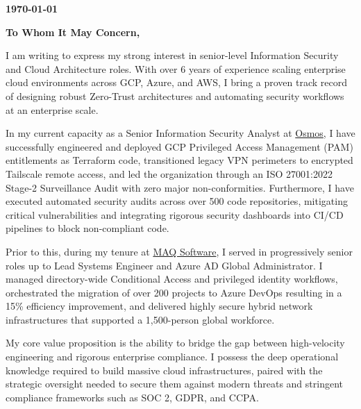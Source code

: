\documentclass[11pt, letterpaper]{article}
\begin{document}
\hfill
\begin{minipage}[t][\textheight]{5.2in}
    \vspace{0.8in}
    \color{maintext}
    
    \textbf{\today}
    
    \vspace{0.4in}
    
    {\Large \textbf{\textcolor{accentcolor}{To Whom It May Concern,}}}
    
    \vspace{0.2in}
    
    I am writing to express my strong interest in senior-level Information Security and Cloud Architecture roles. With over 6 years of experience scaling enterprise cloud environments across GCP, Azure, and AWS, I bring a proven track record of designing robust Zero-Trust architectures and automating security workflows at an enterprise scale.
    
    In my current capacity as a Senior Information Security Analyst at \href{https://osmos.ai}{\textcolor{accentcolor}{Osmos}}, I have successfully engineered and deployed GCP Privileged Access Management (PAM) entitlements as Terraform code, transitioned legacy VPN perimeters to encrypted Tailscale remote access, and led the organization through an ISO 27001:2022 Stage-2 Surveillance Audit with zero major non-conformities. Furthermore, I have executed automated security audits across over 500 code repositories, mitigating critical vulnerabilities and integrating rigorous security dashboards into CI/CD pipelines to block non-compliant code.
    
    Prior to this, during my tenure at \href{https://maqsoftware.com/}{\textcolor{accentcolor}{MAQ Software}}, I served in progressively senior roles up to Lead Systems Engineer and Azure AD Global Administrator. I managed directory-wide Conditional Access and privileged identity workflows, orchestrated the migration of over 200 projects to Azure DevOps resulting in a 15\% efficiency improvement, and delivered highly secure hybrid network infrastructures that supported a 1,500-person global workforce.
    
    My core value proposition is the ability to bridge the gap between high-velocity engineering and rigorous enterprise compliance. I possess the deep operational knowledge required to build massive cloud infrastructures, paired with the strategic oversight needed to secure them against modern threats and stringent compliance frameworks such as SOC 2, GDPR, and CCPA.
    

\end{minipage}
\end{document}
